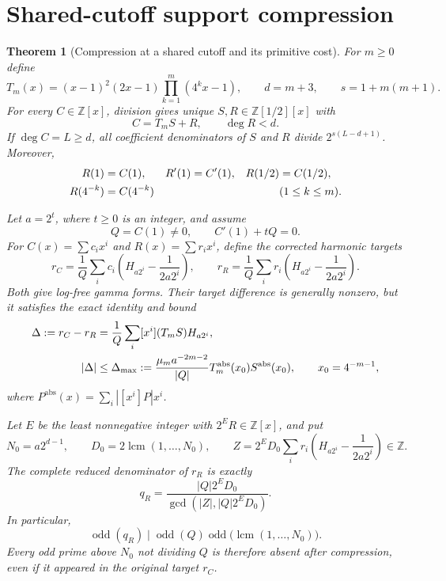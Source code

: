 \documentclass[11pt,a4paper]{article}
\newtheorem{theorem}{Theorem}[section]
\theoremstyle{definition}
\theoremstyle{remark}
\begin{document}
\section{Shared-cutoff support compression}

\begin{theorem}[Compression at a shared cutoff and its primitive cost]
\label{sea-arith-cutoff-compression}
For $m\ge0$ define
\[
 T_m(x)=(x-1)^2(2x-1)\prod_{k=1}^m(4^kx-1),\qquad
 d=m+3,\qquad s=1+m(m+1).
\]
For every $C\in\mathbb Z[x]$, division gives unique
$S,R\in\mathbb Z[1/2][x]$ with
\[
 C=T_mS+R,\qquad \deg R<d.
\]
If $\deg C=L\ge d$, all coefficient denominators of $S$ and $R$ divide
$2^{s(L-d+1)}$. Moreover,
\begin{align}
 R(1)&=C(1),& R'(1)&=C'(1),& R(1/2)&=C(1/2),\notag\\
 R(4^{-k})&=C(4^{-k})&&&&(1\le k\le m).
 \label{sea-arith-compression-invariants}
\end{align}

Let $a=2^t$, where $t\ge0$ is an integer, and assume
\begin{equation}
 Q=C(1)\ne0,\qquad C'(1)+tQ=0.
 \label{sea-arith-whole-log-condition}
\end{equation}
For $C(x)=\sum c_ix^i$ and $R(x)=\sum r_ix^i$, define the corrected
harmonic targets
\begin{equation}
 r_C=\frac1Q\sum_i c_i\left(H_{a2^i}-\frac1{2a2^i}\right),\qquad
 r_R=\frac1Q\sum_i r_i\left(H_{a2^i}-\frac1{2a2^i}\right).
 \label{sea-arith-corrected-targets}
\end{equation}
Both give log-free gamma forms. Their target difference is generally
nonzero, but it satisfies the exact identity and bound
\begin{align}
 \Delta:=r_C-r_R
   &=\frac1Q\sum_i[x^i](T_mS)H_{a2^i},\notag\\
 |\Delta|&\le\Delta_{\max}:=
 \frac{\mu_m a^{-2m-2}}{|Q|}
 T_m^{\mathrm{abs}}(x_0)S^{\mathrm{abs}}(x_0),\qquad
 x_0=4^{-m-1},
 \label{sea-arith-compression-delta}
\end{align}
where $P^{\mathrm{abs}}(x)=\sum_i|[x^i]P|x^i$.

Let $E$ be the least nonnegative integer with $2^ER\in\mathbb Z[x]$,
and put
\[
 N_0=a2^{d-1},\qquad D_0=2\operatorname{lcm}(1,\ldots,N_0),\qquad
 Z=2^ED_0\sum_i r_i\left(H_{a2^i}-\frac1{2a2^i}\right)\in\mathbb Z.
\]
The complete reduced denominator of $r_R$ is exactly
\begin{equation}
 q_R=\frac{|Q|2^ED_0}{\gcd(|Z|,|Q|2^ED_0)}.
 \label{sea-arith-compressed-final-q}
\end{equation}
In particular,
\[
 \operatorname{odd}(q_R)\mid
 \operatorname{odd}(Q)\operatorname{odd}
        \bigl(\operatorname{lcm}(1,\ldots,N_0)\bigr).
\]
Every odd prime above $N_0$ not dividing $Q$ is therefore absent after
compression, even if it appeared in the original target $r_C$.


\end{theorem}
\end{document}
